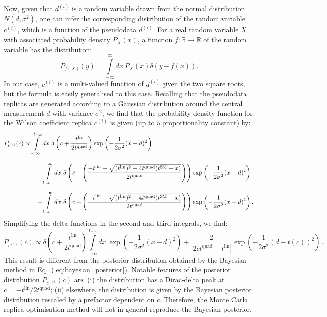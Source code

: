 \documentclass[withindex,glossary]{cam-thesis}
\begin{document}
Now, given that $d^{(i)}$ is a random variable drawn from the normal distribution $N(d,\sigma^2)$, one can infer the corresponding distribution of the random variable $c^{(i)}$, which is a function of the pseudodata $d^{(i)}$.
%
For a real random variable $X$ with associated probability density $P_X(x)$, a function $f : \mathbb{R} \rightarrow \mathbb{R}$ of the random variable has the distribution:
\begin{equation}
P_{f(X)}(y) = \int\limits_{-\infty}^{\infty} dx\ P_X(x) \delta(y - f(x)).
\end{equation}
In our case, $c^{(i)}$ is a multi-valued function of $d^{(i)}$ given the two square roots, but the formula is easily generalised to this case.
%
Recalling that the pseudodata replicas are generated according
to a Gaussian distribution around the central measurement $d$ with variance $\sigma^2$,
we find that the probability density function for the Wilson coefficient replica
$c^{(i)}$ is given (up to a proportionality constant) by:
\begin{align}
P_{c^{(i)}}(c) &\propto \int\limits_{-\infty}^{t_{\text{min}}} dx\ \delta\left( c + \frac{t^{\text{lin}}}{2t^{\text{quad}}} \right) \exp\left( -\frac{1}{2\sigma^2} (x - d)^2 \right) \notag \\[1.5ex]
&\qquad + \int\limits_{t_{\text{min}}}^{\infty} dx\  \delta\left( c - \left(\frac{-t^{\text{lin}} + \sqrt{(t^{\text{lin}})^2 - 4t^{\text{quad}}(t^{\text{SM}} - x)}}{2t^{\text{quad}}}\right)\right)\exp\left( -\frac{1}{2\sigma^2} (x - d)^2 \right) \notag\\[1.5ex]
& \qquad + \int\limits_{t_{\text{min}}}^{\infty} dx\ \delta\left( c - \left(\frac{-t^{\text{lin}} - \sqrt{(t^{\text{lin}})^2 - 4t^{\text{quad}}(t^{\text{SM}} - x)}}{2t^{\text{quad}}}\right)\right) \exp\left( -\frac{1}{2\sigma^2} (x - d)^2 \right).
\end{align}
Simplifying the delta functions in the second and third integrals, we find:
\begin{equation}
\label{eq:mc_posterior}
P_{c^{(i)}}(c) \propto \delta\left( c + \frac{t^{\text{lin}}}{2t^{\text{quad}}} \right) \int\limits_{-\infty}^{t_{\text{min}}} dx\ \exp\left( -\frac{1}{2\sigma^2} (x - d)^2 \right) + \frac{2}{|2ct^{\text{quad}}  + t^{\text{lin}}|} \exp\left( -\frac{1}{2\sigma^2} (d - t(c))^2 \right) \, .
\end{equation}
This result is different from the posterior distribution obtained by the Bayesian method in Eq.~(\ref{eq:bayesian_posterior}). Notable features of the posterior distribution $P_{c^{(i)}}(c)$ are: (i) the distribution has a Dirac-delta peak at $c = -t^{\text{lin}}/2t^{\text{quad}}$; (ii) elsewhere, the distribution is given by the Bayesian posterior distribution rescaled by a prefactor dependent on $c$.
%
Therefore, the Monte Carlo
replica optimisation method will not in general reproduce the Bayesian posterior.
\end{document}
